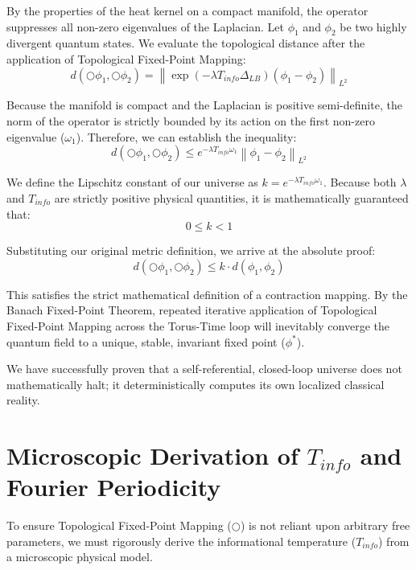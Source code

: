 \documentclass[12pt,openany]{book}
\theoremstyle{plain}
\theoremstyle{definition}
\theoremstyle{remark}
\begin{document}
By the properties of the heat kernel on a compact manifold, the operator suppresses all non-zero eigenvalues of the Laplacian. Let $\phi_1$ and $\phi_2$ be two highly divergent quantum states. We evaluate the topological distance after the application of Topological Fixed-Point Mapping:
\begin{equation}
d(\bigcirc \phi_1, \bigcirc \phi_2) = \left\| \exp(-\lambda T_{info} \Delta_{LB}) (\phi_1 - \phi_2) \right\|_{L^2}
\end{equation}

Because the manifold is compact and the Laplacian is positive semi-definite, the norm of the operator is strictly bounded by its action on the first non-zero eigenvalue ($\omega_1$). Therefore, we can establish the inequality:
\begin{equation}
d(\bigcirc \phi_1, \bigcirc \phi_2) \le e^{-\lambda T_{info} \omega_1} \left\| \phi_1 - \phi_2 \right\|_{L^2}
\end{equation}

We define the Lipschitz constant of our universe as $k = e^{-\lambda T_{info} \omega_1}$. Because both $\lambda$ and $T_{info}$ are strictly positive physical quantities, it is mathematically guaranteed that:
\begin{equation}
0 \le k < 1
\end{equation}

Substituting our original metric definition, we arrive at the absolute proof:
\begin{equation}
d(\bigcirc \phi_1, \bigcirc \phi_2) \le k \cdot d(\phi_1, \phi_2)
\end{equation}

This satisfies the strict mathematical definition of a contraction mapping. By the Banach Fixed-Point Theorem, repeated iterative application of Topological Fixed-Point Mapping across the Torus-Time loop will inevitably converge the quantum field to a unique, stable, invariant fixed point ($\phi^*$). 

We have successfully proven that a self-referential, closed-loop universe does not mathematically halt; it deterministically computes its own localized classical reality.

\section{Microscopic Derivation of $T_{info}$ and Fourier Periodicity}

To ensure Topological Fixed-Point Mapping ($\bigcirc$) is not reliant upon arbitrary free parameters, we must rigorously derive the informational temperature ($T_{info}$) from a microscopic physical model.
\end{document}
